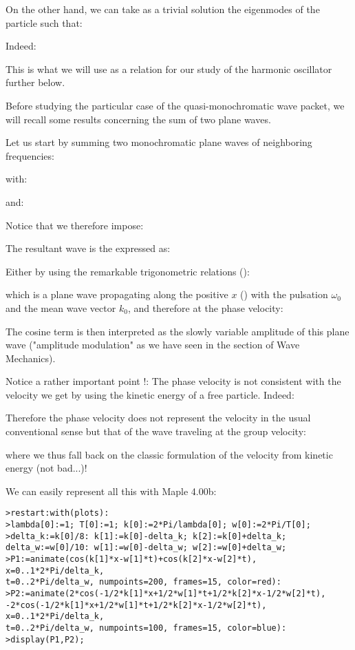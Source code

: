 	On the other hand, we can take as a trivial solution the eigenmodes of the particle such that:
	
	Indeed:
	
	This is what we will use as a relation for our study of the harmonic oscillator further below.

	Before studying the particular case of the quasi-monochromatic wave packet, we will recall some results concerning the sum of two plane waves.

	Let us start by summing two monochromatic plane waves of neighboring frequencies:
	
	with:
	
	and:
	
	Notice that we therefore impose:
	
	The resultant wave is the expressed as:
	
	Either by using the remarkable trigonometric relations ():
	
	which is a plane wave propagating along the positive $x$ () with the pulsation $\omega_0$ and the mean wave vector $k_0$, and therefore at the phase velocity:
	
	The cosine term is then interpreted as the slowly variable amplitude of this plane wave ("amplitude modulation" as we have seen in the section of Wave Mechanics).

	Notice a rather important point !: The phase velocity is not consistent with the velocity we get by using the kinetic energy of a free particle. Indeed:
	
	Therefore the phase velocity does not represent the velocity in the usual conventional sense but that of the wave traveling at the group velocity:
	
	where we thus fall back on the classic formulation of the velocity from kinetic energy (not bad...)!

	We can easily represent all this with Maple 4.00b:
	
	\pagebreak
	\texttt{>restart:with(plots):\\
	>lambda[0]:=1; T[0]:=1; k[0]:=2*Pi/lambda[0]; w[0]:=2*Pi/T[0];\\
	>delta\_k:=k[0]/8: k[1]:=k[0]-delta\_k; k[2]:=k[0]+delta\_k;\\
delta\_w:=w[0]/10: w[1]:=w[0]-delta\_w; w[2]:=w[0]+delta\_w;\\
	>P1:=animate(cos(k[1]*x-w[1]*t)+cos(k[2]*x-w[2]*t), x=0..1*2*Pi/delta\_k, \\
	t=0..2*Pi/delta\_w, numpoints=200, frames=15, color=red):\\
	>P2:=animate({2*cos(-1/2*k[1]*x+1/2*w[1]*t+1/2*k[2]*x-1/2*w[2]*t), \\
	-2*cos(-1/2*k[1]*x+1/2*w[1]*t+1/2*k[2]*x-1/2*w[2]*t)}, x=0..1*2*Pi/delta\_k,\\
	 t=0..2*Pi/delta\_w, numpoints=100, frames=15, color=blue):\\
	>display(P1,P2);}
	
